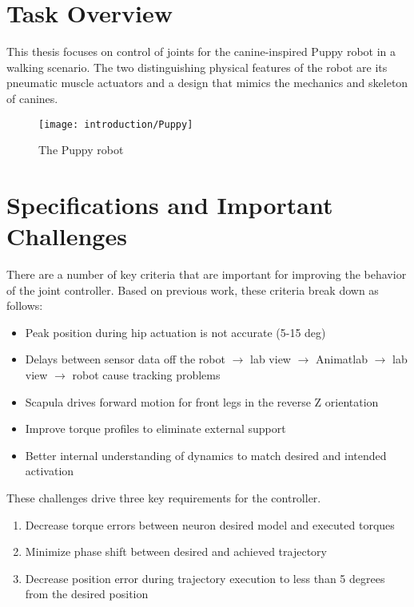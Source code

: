 \section{Task Overview}

This thesis focuses on control of joints for the canine-inspired
Puppy robot in a walking scenario. The two distinguishing physical features of 
the robot are its pneumatic muscle actuators and a design that mimics the mechanics and skeleton of canines.

\begin{figure}
\centering
\texttt{[image: introduction/Puppy]}
\caption{The Puppy robot}
\label{fig:Puppy}
\end{figure}

\section{Specifications and Important Challenges}

There are a number of key criteria that are important for improving the behavior
of the joint controller. Based on previous work, these criteria break down as follows:

\begin{itemize}
\item Peak position during hip actuation is not accurate (5-15 deg) 
\item Delays between sensor data off the robot $\rightarrow$ lab view $\rightarrow$ Animatlab $\rightarrow$ lab
view $\rightarrow$ robot cause tracking problems
\item Scapula drives forward motion for front legs in the reverse Z orientation
\item Improve torque profiles to eliminate external support
\item Better internal understanding of dynamics to match desired and intended activation
\end{itemize}

These challenges drive three key requirements for the controller.

\begin{enumerate}
\item Decrease torque errors between neuron desired model and executed torques
\item Minimize phase shift between desired and achieved trajectory
\item Decrease position error during trajectory execution to less than 5 degrees from the desired position
\end{enumerate}

